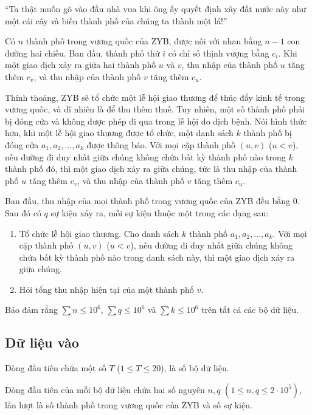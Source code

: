 \documentclass[11pt]{article}
\begin{document}
``Ta thật muốn gõ vào đầu nhà vua khi ông ấy quyết định xây đất nước này như
một cái cây và biến thành phố của chúng ta thành một lá!''

Có \(n\) thành phố trong vương quốc của ZYB, được nối với nhau bằng \(n-1\)
con đường hai chiều. Ban đầu, thành phố thứ \(i\) có chỉ số thịnh vượng bằng
\(c_i\). Khi một giao dịch xảy ra giữa hai thành phố \(u\) và \(v\), thu nhập
của thành phố \(u\) tăng thêm \(c_v\), và thu nhập của thành phố \(v\) tăng
thêm \(c_u\).

Thỉnh thoảng, ZYB sẽ tổ chức một lễ hội giao thương để thúc đẩy kinh tế trong
vương quốc, và dĩ nhiên là để thu thêm thuế. Tuy nhiên, một số thành phố phải
bị đóng cửa và không được phép đi qua trong lễ hội do dịch bệnh. Nói hình
thức hơn, khi một lễ hội giao thương được tổ chức, một danh sách \(k\) thành
phố bị đóng cửa \(a_1,a_2,\ldots,a_k\) được thông báo. Với mọi cặp thành phố
\((u,v)\) (\(u<v\)), nếu đường đi duy nhất giữa chúng không chứa bất kỳ thành
phố nào trong \(k\) thành phố đó, thì một giao dịch xảy ra giữa chúng, tức là
thu nhập của thành phố \(u\) tăng thêm \(c_v\), và thu nhập của thành phố
\(v\) tăng thêm \(c_u\).

Ban đầu, thu nhập của mọi thành phố trong vương quốc của ZYB đều bằng \(0\).
Sau đó có \(q\) sự kiện xảy ra, mỗi sự kiện thuộc một trong các dạng sau:
\begin{enumerate}
  \item Tổ chức lễ hội giao thương. Cho danh sách \(k\) thành phố
  \(a_1,a_2,\ldots,a_k\). Với mọi cặp thành phố \((u,v)\) (\(u<v\)), nếu
  đường đi duy nhất giữa chúng không chứa bất kỳ thành phố nào trong danh sách
  này, thì một giao dịch xảy ra giữa chúng.
  \item Hỏi tổng thu nhập hiện tại của một thành phố \(v\).
\end{enumerate}

Bảo đảm rằng \(\sum n\le 10^6\), \(\sum q\le 10^6\) và \(\sum k\le 10^6\)
trên tất cả các bộ dữ liệu.

\subsection*{Dữ liệu vào}

Dòng đầu tiên chứa một số \(T\) (\(1\le T\le 20\)), là số bộ dữ liệu.

Dòng đầu tiên của mỗi bộ dữ liệu chứa hai số nguyên \(n,q\)
\((1\le n,q\le 2\cdot 10^5)\), lần lượt là số thành phố trong vương quốc của
ZYB và số sự kiện.
\end{document}
